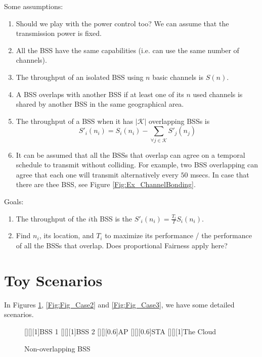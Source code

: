 \documentclass[11pt]{article}
\begin{document}
Some assumptions:

\begin{enumerate}
	\item Should we play with the power control too? We can assume that the transmission power is fixed.
	\item All the BSS have the same capabilities (i.e. can use the same number of channels).
	\item The throughput of an isolated BSS using $n$ basic channels is $S(n)$. 
	\item A BSS overlaps with another BSS if at least one of its $n$ used channels is shared by another BSS in the same geographical area.
	\item The throughput of a BSS when it has $|\mathcal{K}|$ overlapping BSSs is $$S'_i(n_i)=S_i(n_i)-\sum_{\forall j \in \mathcal{K}}{S'_j(n_j)}$$
	\item It can be assumed that all the BSSs that overlap can agree on a temporal schedule to transmit without colliding. For example, two BSS overlapping can agree that each one will transmit alternatively every $50$ msecs. In case that there are thee BSS, see Figure \ref{Fig:Ex_ChannelBonding}.
\end{enumerate}

Goals:

\begin{enumerate}
	\item The throughput of the $i$th BSS is the $S'_i(n_i)=\frac{T_i}{T}S_i(n_i)$.
	\item Find $n_i$, its location, and $T_i$ to maximize its performance / the performance of all the BSSs that overlap. Does proportional Fairness apply here?
\end{enumerate}

\clearpage

\section{Toy Scenarios}

In Figures \ref{Fig:Fig_Case1}, \ref{Fig:Fig_Case2} and \ref{Fig:Fig_Case3}, we have some detailed scenarios.

\begin{figure}[t!]
	[][][1]{BSS 1}
	[][][1]{BSS 2}	
	[][][0.6]{AP}
	[][][0.6]{STA}
	[][][1]{The Cloud}	
	\centering
	\caption{Non-overlapping BSS}\label{Fig:Fig_Case1}
\end{figure}
\end{document}

